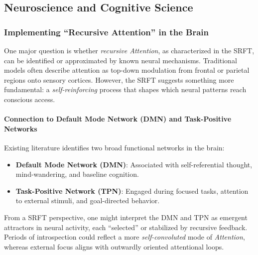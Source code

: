 \documentclass[12pt,a4paper]{article}
\begin{document}
\subsection{Neuroscience and Cognitive Science}
\label{subsec:neuroscience-cogsci}

\subsubsection{Implementing ``Recursive Attention'' in the Brain}
One major question is whether \emph{recursive Attention}, as characterized in the SRFT, can be identified or approximated by known neural mechanisms. Traditional models often describe attention as top-down modulation from frontal or parietal regions onto sensory cortices. However, the SRFT suggests something more fundamental: a \emph{self-reinforcing} process that shapes which neural patterns reach conscious access.

\paragraph{Connection to Default Mode Network (DMN) and Task-Positive Networks}
Existing literature \cite{Fox2005} identifies two broad functional networks in the brain:
\begin{itemize}
    \item \textbf{Default Mode Network (DMN)}: Associated with self-referential thought, mind-wandering, and baseline cognition.
    \item \textbf{Task-Positive Network (TPN)}: Engaged during focused tasks, attention to external stimuli, and goal-directed behavior.
\end{itemize}
From a SRFT perspective, one might interpret the DMN and TPN as emergent attractors in neural activity, each “selected” or stabilized by recursive feedback. Periods of introspection could reflect a more \emph{self-convoluted} mode of \emph{Attention}, whereas external focus aligns with outwardly oriented attentional loops.
\end{document}
